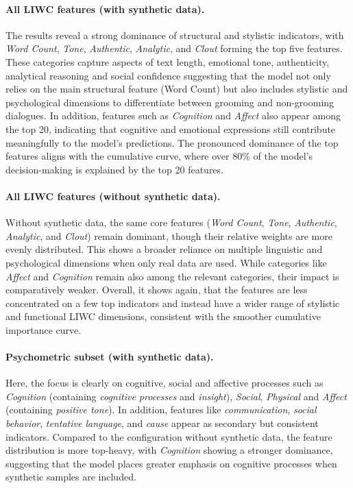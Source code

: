 \paragraph{All LIWC features (with synthetic data).}
The results reveal a strong dominance of structural and stylistic indicators, with \textit{Word Count}, \textit{Tone}, \textit{Authentic}, \textit{Analytic}, and \textit{Clout} forming the top five features. These categories capture aspects of text length, emotional tone, authenticity, analytical reasoning and social confidence suggesting that the model not only relies on the main structural feature (Word Count) but also includes stylistic and psychological dimensions to differentiate between grooming and non-grooming dialogues. In addition, features such as \textit{Cognition} and \textit{Affect} also appear among the top 20, indicating that cognitive and emotional expressions still contribute meaningfully to the model’s predictions. The pronounced dominance of the top features aligns with the cumulative curve, where over 80\% of the model’s decision-making is explained by the top 20 features.

\paragraph{All LIWC features (without synthetic data).}
Without synthetic data, the same core features (\textit{Word Count}, \textit{Tone}, \textit{Authentic}, \textit{Analytic}, and \textit{Clout}) remain dominant, though their relative weights are more evenly distributed. This shows a broader reliance on multiple linguistic and psychological dimensions when only real data are used. While categories like \textit{Affect} and \textit{Cognition} remain also among the relevant categories, their impact is comparatively weaker. Overall, it shows again, that the features are less concentrated on a few top indicators and instead have a wider range of stylistic and functional LIWC dimensions, consistent with the smoother cumulative importance curve.


\paragraph{Psychometric subset (with synthetic data).}
Here, the focus is clearly on cognitive, social and affective processes such as \textit{Cognition} (containing \textit{cognitive processes} and \textit{insight}), \textit{Social}, \textit{Physical} and \textit{Affect} (containing \textit{positive tone}). In addition, features like \textit{communication}, \textit{social behavior}, \textit{tentative language}, and \textit{cause} appear as secondary but consistent indicators. Compared to the configuration without synthetic data, the feature distribution is more top-heavy, with \textit{Cognition} showing a stronger dominance, suggesting that the model places greater emphasis on cognitive processes when synthetic samples are included.

